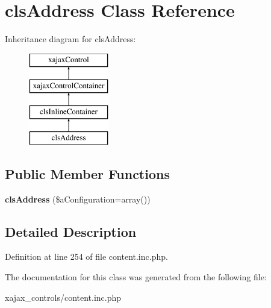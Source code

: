 \hypertarget{classclsAddress}{
\section{clsAddress Class Reference}
\label{classclsAddress}
}
Inheritance diagram for clsAddress:\begin{figure}[H]
\begin{center}
\leavevmode
\includegraphics[height=4.000000cm]{classclsAddress}
\end{center}
\end{figure}
\subsection*{Public Member Functions}
\begin{DoxyCompactItemize}
\item 
\hypertarget{classclsAddress_a95d1c6860bfcdcec21ec229a59944c34}{
{\bfseries clsAddress} (\$aConfiguration=array())}
\label{classclsAddress_a95d1c6860bfcdcec21ec229a59944c34}

\end{DoxyCompactItemize}


\subsection{Detailed Description}


Definition at line 254 of file content.inc.php.



The documentation for this class was generated from the following file:\begin{DoxyCompactItemize}
\item 
xajax\_\-controls/content.inc.php\end{DoxyCompactItemize}
